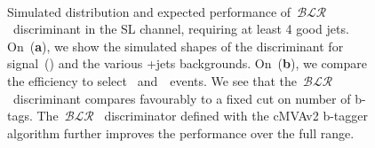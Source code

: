 \begin{figure}
\begin{centering}
\\
\caption[Expected performance of the b-tag likelihood ratio discriminant.]{Simulated distribution and expected performance of~$\mathcal{BLR}$~discriminant in the SL channel, requiring at least 4 good jets. On~(\textbf{a}), we show the simulated shapes of the discriminant for signal~(\ttHbb) and the various \ttbar+jets backgrounds. On~(\textbf{b}), we compare the efficiency to select~\ttHbb\xspace and~\ttlf~events. We see that the~$\mathcal{BLR}$~discriminant compares favourably to a fixed cut on number of b-tags. The~$\mathcal{BLR}$~ discriminator defined with the cMVAv2 b-tagger algorithm further improves the performance over the full range.}
\label{fig:blr_discrimination}
\end{centering}
\end{figure}


